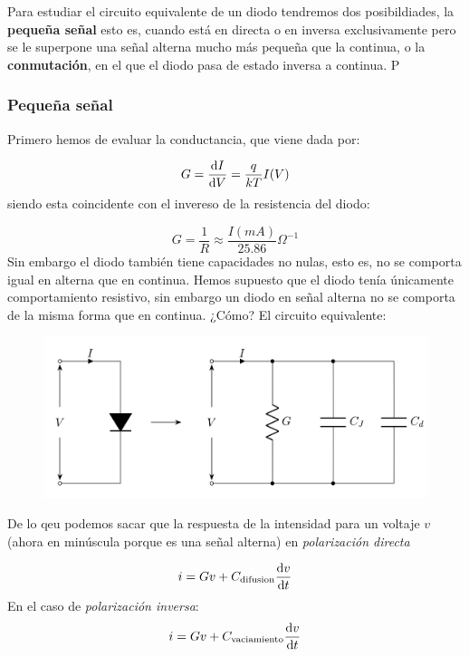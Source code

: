 Para estudiar el circuito equivalente de un diodo tendremos dos posibildiades, la \textbf{pequeña señal} esto es, cuando está en directa o en inversa exclusivamente pero se le superpone una señal alterna mucho más pequeña que la continua, o la \textbf{conmutación}, en el que el diodo pasa de estado inversa a continua. P

\subsubsection{Pequeña señal}

Primero hemos de evaluar la conductancia, que viene dada por:

\begin{equation}
    G = \frac{\mathrm{d} I}{\mathrm{d} V} = \frac{q}{kT} I(V)
\end{equation}
siendo esta coincidente con el invereso de la resistencia del diodo:

\begin{equation}
    G = \frac{1}{R} \approx \frac{I(\unit{mA})}{25.86} \Omega^{-1}
\end{equation}
Sin embargo el diodo también tiene capacidades no nulas, esto es, no se comporta igual en alterna que en continua.
Hemos supuesto que el diodo tenía únicamente comportamiento resistivo, sin embargo un diodo en señal alterna no se comporta de la misma forma que en continua. ¿Cómo? El circuito equivalente: 

\begin{figure}[h!] \centering
    \includegraphics[width=0.6\linewidth]{Cuerpo/Ch_03/03_Temario_12}
\end{figure}
De lo qeu podemos sacar que la respuesta de la intensidad para un voltaje $v$  (ahora en minúscula porque es una señal alterna) en \textit{polarización directa}

\begin{equation}
    i = G v + C_{\text{difusion}} \frac{\mathrm{d} v}{\mathrm{d} t} 
\end{equation}
En el caso de \textit{polarización inversa}:
\begin{equation}
    i = G v + C_{\text{vaciamiento}} \frac{\mathrm{d} v}{\mathrm{d} t} 
\end{equation}

